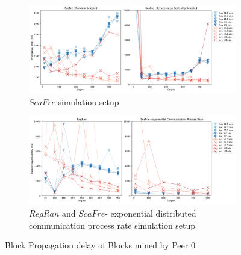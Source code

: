 \begin{figure}[tbp]
	\begin{subfigure}[b]{\textwidth}
		\includegraphics[width=\textwidth]{figures/sm_edge_blockprop_barabasi.pdf}
		\caption{$ScaFre$ simulation setup}
		\label{fig:blockprop_bara}
	\end{subfigure}
	\begin{subfigure}[b]{\textwidth}
		\includegraphics[width=\textwidth]{figures/sm_edge_block_prop_rr_and_bc_dc.pdf}
		\caption{$RegRan$ and $ScaFre$- exponential distributed communication process rate simulation setup}
		\label{fig:blockprop_2}
	\end{subfigure}
\caption{Block Propagation delay of Blocks mined by Peer $0$}
\label{fig:blockprops}
\end{figure}\\
